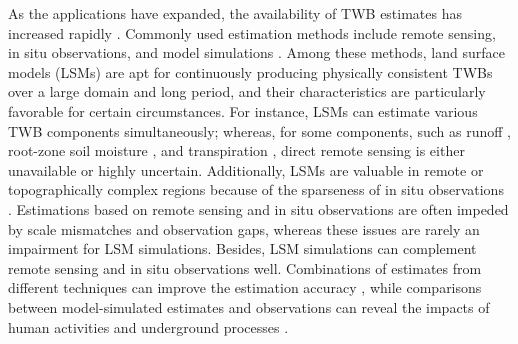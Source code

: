 \documentclass[essd, manuscript]{copernicus}
\begin{document}
As the applications have expanded, the availability of TWB estimates has increased rapidly \citep{peters-lidard2018MM, saxe2021HESS, zhang2018HESS}. Commonly used estimation methods include remote sensing, in situ observations, and model simulations \citep{saxe2021HESS, mccabe2017HESS, pan2012JC, gao2010IJRS, trenberth2007JH}. Among these methods, land surface models (LSMs) are apt for continuously producing physically consistent TWBs over a large domain and long period, and their characteristics are particularly favorable for certain circumstances. For instance, LSMs can estimate various TWB components simultaneously; whereas, for some components, such as runoff \citep{lin2019WRRa, beck2017HESS}, root-zone soil moisture \citep{xia2015JHa, xia2015JH}, and transpiration \citep{lian2018NCC}, direct remote sensing is either unavailable or highly uncertain. Additionally, LSMs are valuable in remote or topographically complex regions because of the sparseness of in situ observations \citep{kim2021TC}. Estimations based on remote sensing and in situ observations are often impeded by scale mismatches and observation gaps, whereas these issues are rarely an impairment for LSM simulations. Besides, LSM simulations can complement remote sensing and in situ observations well. Combinations of estimates from different techniques can improve the estimation accuracy \citep{zhang2018HESS, pan2012JC, zhao2018RSE}, while comparisons between model-simulated estimates and observations can reveal the impacts of human activities \citep{zaussinger2019HESS} and underground processes \citep{zheng2020JAMES}.
\end{document}
